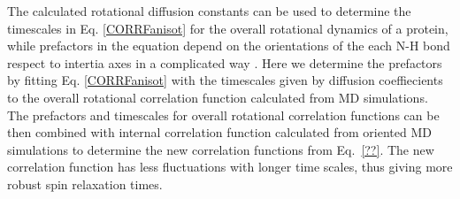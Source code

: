 \documentclass[pre,aps,floatfix,authordate1-4,twocolumn]{revtex4-1}
\begin{document}
The calculated rotational diffusion constants can be used to determine
the timescales in Eq. \ref{CORRFanisot} for the overall rotational
dynamics of a protein, while prefactors in the equation depend on the
orientations of the each N-H bond respect to intertia axes in a complicated way \cite{??}.
Here we determine the prefactors by fitting Eq. \ref{CORRFanisot} with the timescales
given by diffusion coeffiecients to the overall rotational correlation function
calculated from MD simulations. The prefactors and timescales for overall
rotational correlation functions can be then combined with internal
correlation function calculated from oriented MD simulations to determine
the new correlation functions from Eq.~\ref{??}. The 
new correlation function has less fluctuations with longer time
scales, thus giving more robust spin relaxation times. 
\end{document}
